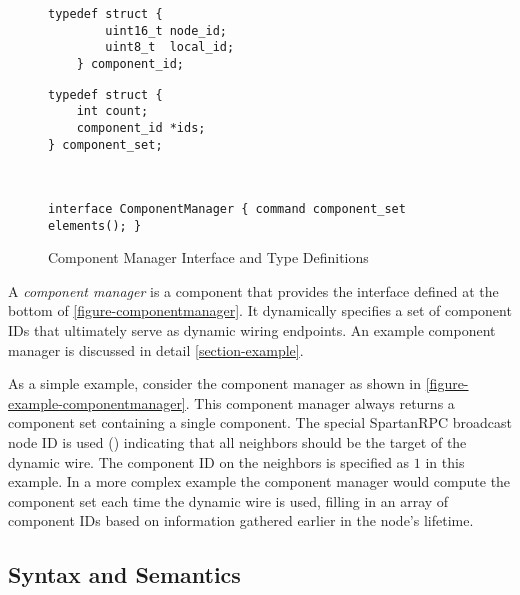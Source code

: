 \begin{figure}[!t]
\begin{textbox}{4in}
\begin{minipage}[t]{1.75in}
\begin{Verbatim}[fontsize=\small]
    typedef struct {
        uint16_t node_id;
        uint8_t  local_id;
    } component_id;
\end{Verbatim}
\end{minipage}
\hfill
\begin{minipage}[t]{1.75in}
\begin{Verbatim}[fontsize=\small]
typedef struct {
    int count;
    component_id *ids;
} component_set;
\end{Verbatim}
\end{minipage}
\\
\centering
\begin{minipage}[t]{5.8in}
\vspace{1.5em}
\begin{Verbatim}[fontsize=\small]
interface ComponentManager { command component_set elements(); }
\end{Verbatim}
\end{minipage}
\end{textbox}
\caption{Component Manager Interface and Type Definitions}
\label{figure-componentmanager}
\end{figure}

A \emph{component manager} is a component that provides the  interface
defined at the bottom of \autoref{figure-componentmanager}. It dynamically specifies a set of
component IDs that ultimately serve as dynamic wiring endpoints. An example component manager is
discussed in detail \autoref{section-example}.

As a simple example, consider the component manager  as shown in
\autoref{figure-example-componentmanager}. This component manager always returns a component set
containing a single component. The special SpartanRPC broadcast node ID is used ()
indicating that all neighbors should be the target of the dynamic wire. The component ID on the
neighbors is specified as $1$ in this example. In a more complex example the component manager
would compute the component set each time the dynamic wire is used, filling in an array of
component IDs based on information gathered earlier in the node's lifetime.


\subsection{Syntax and Semantics}
\label{section-wiringsyntax}

